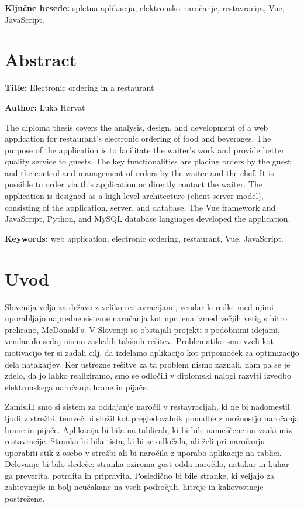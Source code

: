 \documentclass[a4paper, 12pt]{book}
\newcommand{\ttitleEn}{Electronic ordering in a restaurant}
\newcommand{\tauthor}{Luka Horvat}
\newcommand{\tkeywords}{spletna aplikacija, elektronsko naročanje, restavracija, Vue, JavaScript}
\newcommand{\tkeywordsEn}{web application, electronic ordering, restaurant, Vue, JavaScript}
\newcommand{\clearemptydoublepage}{\newpage{\pagestyle{empty}\cleardoublepage}}
\begin{document}
\noindent\textbf{Ključne besede:} \tkeywords.
\clearemptydoublepage

\chapter*{Abstract}

\noindent\textbf{Title:} \ttitleEn
\bigskip

\noindent\textbf{Author:} \tauthor
\bigskip

\noindent The diploma thesis covers the analysis, design, and development of a web application for restaurant's electronic ordering of food and beverages. The purpose of the application is to facilitate the waiter's work and provide better quality service to guests. The key functionalities are placing orders by the guest and the control and management of orders by the waiter and the chef. It is possible to order via this application or directly contact the waiter. The application is designed as a high-level architecture (client-server model), consisting of the application, server, and database. The Vue framework and JavaScript, Python, and MySQL database languages developed the application.
\bigskip

\noindent\textbf{Keywords:} \tkeywordsEn.
\clearemptydoublepage

\mainmatter
\setcounter{page}{1}
\pagestyle{fancy}
 
\chapter{Uvod}
Slovenija velja za državo z veliko restavracijami, vendar le redke med njimi uporabljajo napredne sisteme naročanja kot npr. ena izmed večjih verig s hitro prehrano, McDonald's. V Sloveniji so obstajali projekti s podobnimi idejami, vendar do sedaj nismo zasledili takšnih rešitev. Problematiko smo vzeli kot motivacijo ter si zadali cilj, da izdelamo aplikacijo kot pripomoček za optimizacijo dela natakarjev. Ker ustrezne rešitve za ta problem nismo zaznali, nam pa se je zdelo, da jo lahko realiziramo, smo se odločili v diplomski nalogi razviti izvedbo elektronskega naročanja hrane in pijače.

Zamislili smo si sistem za oddajanje naročil v restavracijah, ki ne bi nadomestil ljudi v strežbi, temveč bi služil kot pregledovalnik ponudbe z možnostjo naročanja hrane in pijače. Aplikacija bi bila na tablicah, ki bi bile nameščene na vsaki mizi restavracije. Stranka bi bila tista, ki bi se odločala, ali želi pri naročanju uporabiti stik z osebo v strežbi ali bi naročila z uporabo aplikacije na tablici. Delovanje bi bilo sledeče: stranka oziroma gost odda naročilo, natakar in kuhar ga preverita, potrdita in pripravita. Posledično bi bile stranke, ki veljajo za zahtevnejše in bolj neučakane na vseh področjih, hitreje in kakovostneje postrežene. 
\end{document}
